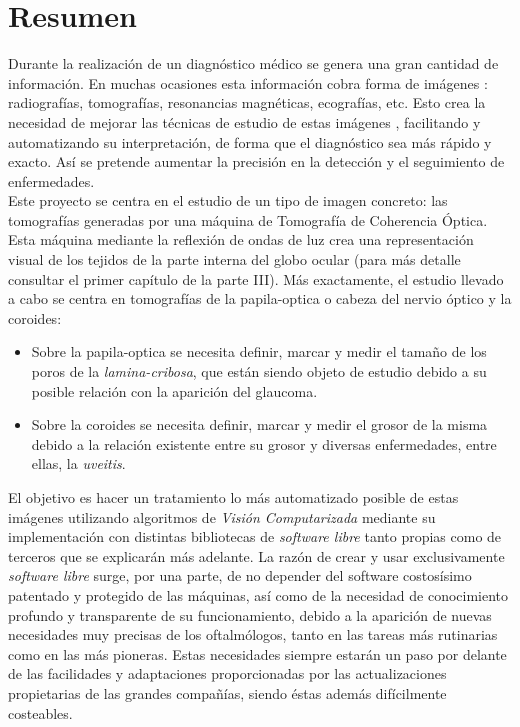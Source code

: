 \section*{Resumen}
Durante la realización de un diagnóstico médico se genera una gran
cantidad de información. En muchas ocasiones esta información cobra
forma de imágenes \emph{\citep*[1. The Analysis of Medical Images,
  2. Digital Image Acquisition]{toennies2012guide}}: radiografías,
tomografías, resonancias magnéticas, ecografías, etc. Esto crea la
necesidad de mejorar las técnicas de estudio de estas imágenes
\emph{\citep*[4. Image Enhancement]{toennies2012guide}}, facilitando y
automatizando su interpretación, de forma que el diagnóstico sea más
rápido y exacto. Así se pretende aumentar la precisión en la detección
y el seguimiento de enfermedades.\\
Este proyecto se centra en el estudio de un tipo de imagen concreto:
las tomografías generadas por una máquina de Tomografía de Coherencia
Óptica. Esta máquina mediante la reflexión de ondas de luz crea una
representación visual de los tejidos de la parte interna del globo
ocular (para más detalle consultar el primer capítulo de la parte
III). Más exactamente, el estudio llevado a cabo se centra en
tomografías de la \gls{papila-optica} o cabeza del nervio óptico y la
\gls{coroides}:
\begin{itemize}
\item Sobre la \gls{papila-optica} se necesita definir, marcar y medir
  el tamaño de los poros de la \emph{\gls{lamina-cribosa}}, que están
  siendo objeto de estudio debido a su posible relación con la
  aparición del \gls{glaucoma}.
\item Sobre la \gls{coroides} se necesita definir, marcar y medir el
  grosor de la misma debido a la relación existente entre su grosor y
  diversas enfermedades, entre ellas, la \emph{\gls{uveitis}}.
\end{itemize}
El objetivo es hacer un tratamiento lo más automatizado posible de
estas imágenes utilizando algoritmos de \emph{Visión Computarizada}
mediante su implementación con distintas bibliotecas de \emph{software
  libre} tanto propias como de terceros que se explicarán más
adelante. La razón de crear y usar exclusivamente \emph{software
  libre} surge, por una parte, de no depender del software costosísimo
patentado y protegido de las máquinas, así como de la necesidad de
conocimiento profundo y transparente de su funcionamiento, debido a la
aparición de nuevas necesidades muy precisas de los oftalmólogos,
tanto en las tareas más rutinarias como en las más pioneras. Estas
necesidades siempre estarán un paso por delante de las facilidades y
adaptaciones proporcionadas por las actualizaciones propietarias de
las grandes compañías, siendo éstas además difícilmente costeables.

